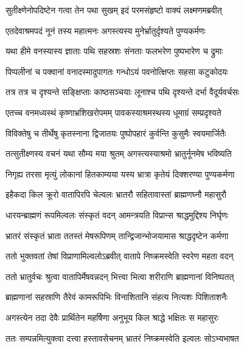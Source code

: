 \twolineshloka
{सुतीक्ष्णेनोपदिष्टेन गत्वा तेन पथा सुखम्}
{इदं परमसंहृष्टो वाक्यं लक्ष्मणमब्रवीत्} %

\twolineshloka
{एतदेवाश्रमपदं नूनं तस्य महात्मनः}
{अगस्त्यस्य मुनेर्भ्रातुर्दृश्यते पुण्यकर्मणः} %

\twolineshloka
{यथा हीमे वनस्यास्य ज्ञाताः पथि सहस्रशः}
{संनताः फलभरेण पुष्पभारेण च द्रुमाः} %

\twolineshloka
{पिप्पलीनां च पक्वानां वनादस्मादुपागतः}
{गन्धोऽयं पवनोत्क्षिप्तः सहसा कटुकोदयः} %

\twolineshloka
{तत्र तत्र च दृश्यन्ते सङ्क्षिप्ताः काष्ठसञ्चयाः}
{लूनाश्च पथि दृश्यन्ते दर्भा वैदूर्यवर्चसः} %

\twolineshloka
{एतच्च वनमध्यस्थं कृष्णाभ्रशिखरोपमम्}
{पावकस्याश्रमस्थस्य धूमाग्रं सम्प्रदृश्यते} %

\twolineshloka
{विविक्तेषु च तीर्थेषु कृतस्नाना द्विजातयः}
{पुष्पोपहारं कुर्वन्ति कुसुमैः स्वयमार्जितैः} %

\twolineshloka
{तत्सुतीक्ष्णस्य वचनं यथा सौम्य मया श्रुतम्}
{अगस्त्यस्याश्रमो भ्रातुर्नूनमेष भविष्यति} %

\twolineshloka
{निगृह्य तरसा मृत्युं लोकानां हितकाम्यया}
{यस्य भ्रात्रा कृतेयं दिक्शरण्या पुण्यकर्मणा} %

\twolineshloka
{इहैकदा किल क्रूरो वातापिरपि चेल्वलः}
{भ्रातरौ सहितावास्तां ब्राह्मणघ्नौ महासुरौ} %

\twolineshloka
{धारयन्ब्राह्मणं रूपमिल्वलः संस्कृतं वदन्}
{आमन्त्रयति विप्रान्स श्राद्धमुद्दिश्य निर्घृणः} %

\twolineshloka
{भ्रातरं संस्कृतं भ्राता ततस्तं मेषरूपिणम्}
{तान्द्विजान्भोजयामास श्राद्धदृष्टेन कर्मणा} %

\twolineshloka
{ततो भुक्तवतां तेषां विप्राणामिल्वलोऽब्रवीत्}
{वातापे निष्क्रमस्वेति स्वरेण महता वदन्} %

\twolineshloka
{ततो भ्रातुर्वचः श्रुत्वा वातापिर्मेषवन्नदन्}
{भित्त्वा भित्वा शरीराणि ब्राह्मणानां विनिष्पतत्} %

\twolineshloka
{ब्राह्मणानां सहस्राणि तैरेवं कामरूपिभिः}
{विनाशितानि संहत्य नित्यशः पिशिताशनैः} %

\twolineshloka
{अगस्त्येन तदा देवैः प्रार्थितेन महर्षिणा}
{अनुभूय किल श्राद्धे भक्षितः स महासुरः} %

\twolineshloka
{ततः सम्पन्नमित्युक्त्वा दत्त्वा हस्तावसेचनम्}
{भ्रातरं निष्क्रमस्वेति इल्वलः सोऽभ्यभाषत} %


